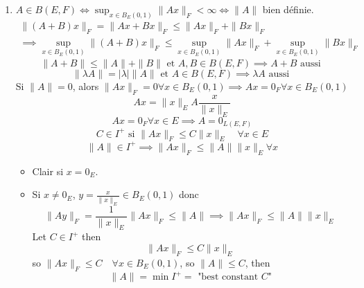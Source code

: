 \begin{preuve}
   \begin{enumerate}
       \item $A \in B(E, F) \iff \sup_{x \in B_{E}(0, 1)} \|Ax\|_{F} < \infty \iff \|A\|$ bien définie.  
           \begin{align*}
               \|(A + B)x\|_F = \|Ax + Bx\|_F \le \|Ax\|_F + \|Bx\|_F\\ \implies \sup_{x \in B_E(0, 1)} \|(A + B)x\|_F \le \sup_{x \in B_E(0, 1)} \|Ax\|_F + \sup_{x \in B_E(0, 1)} \|Bx\|_F
           \end{align*}
           \[
               \|A + B\| \le \|A\| + \|B\| \text{ et } A, B \in B(E, F) \implies A + B \text{ aussi }
           \] 
           \[
           \|\lambda A\| = |\lambda|\|A\| \text{ et } A \in B(E, F) \implies \lambda A \text{ aussi }
           \] 
           Si $\|A\| = 0$, alors  $\|Ax\|_F = 0 \forall x \in B_E(0, 1) \implies Ax = 0_F \forall x \in B_E(0, 1)$
           \[
           Ax = \|x\|_E A \frac{x}{\|x\|_E}
           \] 
           \[
           Ax = 0_F \forall x \in E \implies A = 0_{L(E, F)}
           \] 
           \[
           C \in I^+ \text{ si } \|Ax\|_F \le C\|x\|_E \quad \forall x \in E
           \] 
           \[
           \|A\| \in I^+ \implies \|Ax\|_F \le \|A\|\|x\|_E \forall x
           \] 
           \begin{itemize}
               \item Clair si $x = 0_E$. 
               \item Si  $x \neq 0_E$, $y = \frac{x}{\|x\|_E} \in B_E(0, 1)$ donc 
                   \[
                       \|Ay\|_F = \frac{1}{\|x\|_E}\|Ax\|_F \le \|A\| \implies \|Ax\|_F \le \|A\|\|x\|_E
                   \] 
                   Let $C \in I^+$ then
                   \[
                   \|Ax\|_F \le C\|x\|_E
                   \] 
                   so $\|Ax\|_F \le C \quad \forall x \in B_E(0,1)$, so $\|A\| \le C$, then
                   \[
                       \|A\| = \min I^+ = \text{ "best constant $C$"}
                   \] 
           \end{itemize}
   \end{enumerate} 
\end{preuve}
